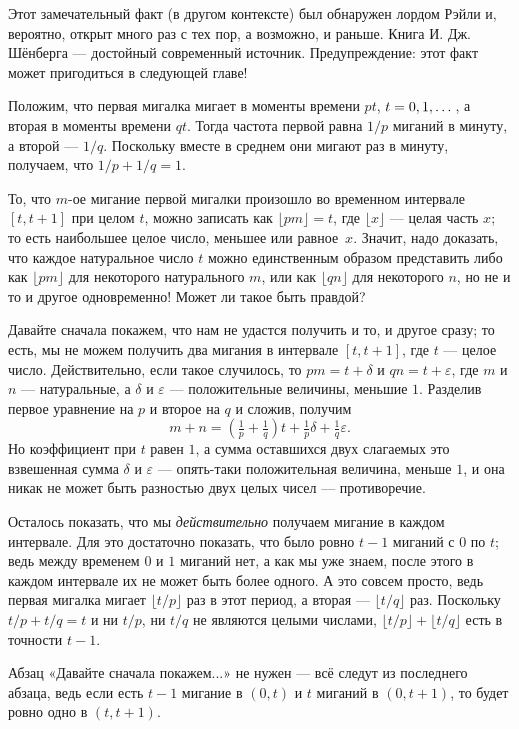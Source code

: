 Этот замечательный факт (в другом контексте) был обнаружен лордом Рэйли и, вероятно, открыт много раз с тех пор, а возможно, и раньше.
Книга И. Дж. Шёнберга \cite{52} --- достойный современный источник.
Предупреждение: этот факт может пригодиться в следующей главе!

Положим, что первая мигалка мигает в моменты времени $pt$, $t \z= 0, 1, \dots$, а вторая в моменты времени $qt$.
Тогда частота первой равна $1/p$ миганий в минуту, а второй --- $1/q$.
Поскольку вместе в среднем они мигают раз в минуту, получаем, что $1/p + 1/q = 1$.

То, что $m$-ое мигание первой мигалки произошло во временном интервале $[t, t + 1]$ при целом $t$,
можно записать как $\lfloor pm\rfloor = t$, где $\lfloor x\rfloor$ — целая часть $x$; то есть наибольшее целое число, меньшее или равное~$x$.
Значит, надо доказать, что каждое натуральное число $t$ можно единственным образом представить либо как $\lfloor pm\rfloor$ для некоторого натурального $m$, или как $\lfloor qn\rfloor$ для некоторого $n$, но не и то и другое одновременно!
Может ли такое быть правдой?

Давайте сначала покажем, что нам не удастся получить и то, и другое сразу;
то есть, мы не можем получить два мигания в интервале $[t, t+1]$, где $t$ --- целое число.
Действительно, если такое случилось, то $pm = t+\delta$ и $qn = t + \varepsilon$, где $m$ и $n$ --- натуральные, а $\delta$ и $\varepsilon$ --- положительные величины, меньшие $1$. 
Разделив первое уравнение на $p$ и второе на $q$ и сложив, получим
\[m+n=(\tfrac1p+\tfrac1q)t+\tfrac1p\delta+\tfrac1q\varepsilon.\]
Но коэффициент при $t$ равен $1$, а сумма оставшихся двух слагаемых это взвешенная сумма $\delta$ и $\varepsilon$ --- опять-таки положительная величина, меньше $1$, и она никак не может быть разностью двух целых чисел --- противоречие.

Осталось показать, что мы \emph{действительно} получаем мигание в каждом интервале.
Для это достаточно показать, что было ровно $t - 1$ миганий с $0$ по $t$;
ведь между временем $0$ и $1$ миганий нет, а как мы уже знаем, после этого в каждом интервале их не может быть более одного.
А это совсем просто, ведь первая мигалка мигает $\lfloor t/p\rfloor$ раз в этот период, а вторая --- $\lfloor t/q\rfloor$ раз.
Поскольку $t/p + t/q = t$ и ни $t/p$, ни $t/q$ не являются целыми числами, $\lfloor t/p\rfloor + \lfloor t/q\rfloor$ есть в точности $t - 1$.

\begin{addedbytheeditors}
Абзац «Давайте сначала покажем...» не нужен --- всё следут из последнего абзаца, ведь если есть $t-1$ мигание в $(0,t)$ и $t$ миганий в $(0,t+1)$, то будет ровно одно в $(t,t+1)$.
\end{addedbytheeditors}


